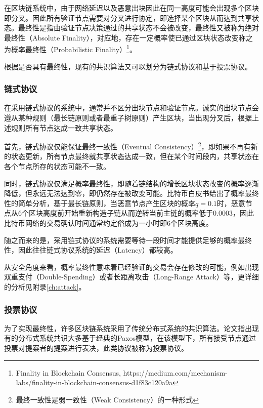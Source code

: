 在区块链系统中，由于网络延迟以及恶意出块因此在同一高度可能会出现多个区块即分叉。因此所有验证节点需要对分叉进行协定，即选择某个区块从而达到共享状态。最终性是指由验证节点决策通过的共享状态不会被改变，最终性又被称为绝对最终性（Absolute Finality），对应地，存在一定概率使已通过区块状态改变称之为概率最终性（Probabilistic Finality）\footnote{Finality in Blockchain Consensus, https://medium.com/mechanism-labs/finality-in-blockchain-consensus-d1f83c120a9a}。

根据是否具有最终性，现有的共识算法又可以划分为链式协议和基于投票协议\cite{wang2019survey}。

\subsubsection{链式协议}
在采用链式协议的系统中，通常并不区分出块节点和验证节点。诚实的出块节点会遵从某种规则（最长链原则或者最重子树原则）产生区块，当出现分叉后，根据上述规则所有节点达成一致共享状态。

首先，链式协议仅能保证最终一致性（Eventual Consistency）\footnote{最终一致性是弱一致性（Weak Consistency）的一种形式}，即如果不再有新的状态更新，所有节点最终就共享状态达成一致，但在某个时间段内，共享状态在各个节点所存的状态可能不一致\cite{brewer2000towards}。

同时，链式协议仅满足概率最终性，即随着链结构的增长区块状态改变的概率逐渐降低，但永远无法达到零，即仍然存在被改变可能。比特币白皮书给出了概率最终性的简单分析，基于最长链原则，当恶意节点产生区块的概率$q=0.1$时，恶意节点从6个区块高度前开始重新构造子链从而逆转当前主链的概率低于$0.0003$\cite{nakamoto2008bitcoin}，因此比特币网络的交易确认时间通常约定俗成为一小时即6个区块高度。

随之而来的是，采用链式协议的系统需要等待一段时间才能提供足够的概率最终性，因此往往链式协议系统的延迟（Latency）都较高\cite{bano2017consensus}。

从安全角度来看，概率最终性意味着已经验证的交易会存在修改的可能，例如出现双重支付（Double-Spending）或者长距离攻击（Long-Range Attack）等\cite{garay2015bitcoin,bahack2013theoretical}，更详细的分析见附录\ref{ch:attack}。



\subsubsection{投票协议}
为了实现最终性，许多区块链系统采用了传统分布式系统的共识算法。论文\cite{howard2019consensus}指出现有的分布式系统共识大多基于经典的Paxos模型\cite{lamport2001paxos}，在该模型下，所有接受节点通过投票对提案者的提案进行表决，此类协议被称为投票协议。

